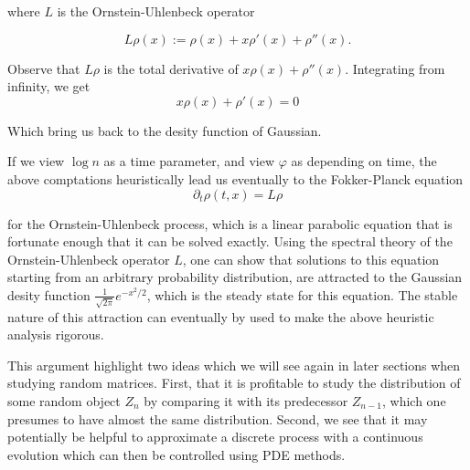 where $L$ is the Ornstein-Uhlenbeck operator

\begin{equation*}
    L\rho(x) := \rho (x) + x\rho'(x)+\rho''(x).
\end{equation*}

Observe that $L\rho$ is the total derivative of $x\rho(x)+\rho''(x)$. Integrating from infinity, we get
\begin{equation*}
    x\rho(x)+\rho'(x)=0
\end{equation*}

Which bring us back to the desity function of Gaussian.

If we view $\log n$ as a time parameter, and view $\varphi$ as depending on time, the above comptations heuristically lead us eventually to the Fokker-Planck equation
\begin{equation*}
    \partial_t \rho(t,x) = L\rho
\end{equation*}

for the Ornstein-Uhlenbeck process, which is a linear parabolic equation that is fortunate enough that it can be solved exactly. Using the spectral theory of the Ornstein-Uhlenbeck operator $L$, one can show that solutions to this equation starting from an arbitrary probability distribution, are attracted to the Gaussian desity function $\frac{1}{\sqrt{2\pi}}e^{-x^2/2}$, which is the steady state for this equation. The stable nature of this attraction can eventually by used to make the above heuristic analysis rigorous.

\begin{remark}
    This argument highlight two ideas which we will see again in later sections when studying random matrices. First, that it is profitable to study the distribution of some random object $Z_n$ by comparing it with its predecessor $Z_{n-1}$, which one presumes to have almost the same distribution. Second, we see that it may potentially be helpful to approximate a discrete process with a continuous evolution which can then be controlled using PDE methods.
\end{remark}


